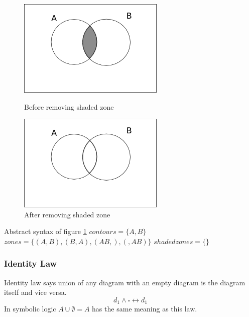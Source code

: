 \documentclass[a4paper]{article}
\begin{document}
\begin{figure}[h]
\begin{minipage}[h]{0.5\linewidth}
\centering
\includegraphics[scale=0.5]{images/diag3add1.png}
\caption{Before removing shaded zone}
\label{fig:d5empty}
\end{minipage}
\hspace{0.5cm}
\begin{minipage}[h]{0.5\linewidth}
\centering
\includegraphics[scale=0.5]{images/d5.png}
\caption{After removing shaded zone}
\label{fig:d5}
\end{minipage}
\end{figure}


Abstract syntax of figure \ref{fig:d5}\newline
$contours =  \lbrace A, B \rbrace $ \newline
$zones = \lbrace (A , B) , (B , A), (AB , ) , ( , AB) \rbrace  $ \newline 
$shaded zones = \lbrace \rbrace  $ \newline

\subsubsection{Identity Law}
Identity law says union of any diagram with an empty diagram is the diagram itself and vice versa. 
$$ d_{1} \wedge \square \longleftrightarrow d_{1}$$
In symbolic logic $A \cup \emptyset = A$ has the same meaning as this law.
\end{document}

